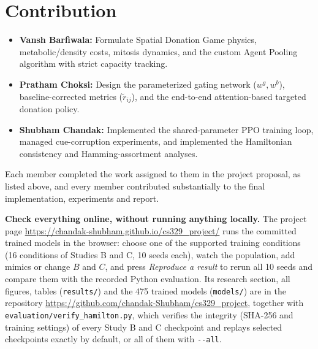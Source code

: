 \documentclass{article}
\begin{document}
\section{Contribution}
\begin{itemize}
    \item \textbf{Vansh Barfiwala:} Formulate Spatial Donation Game physics, metabolic/density costs, mitosis dynamics, and the custom Agent Pooling algorithm with strict capacity tracking.
    \item \textbf{Pratham Choksi:} Design the parameterized gating network ($w^g, w^b$), baseline-corrected metrics ($\tilde{r}_{ij}$), and the end-to-end attention-based targeted donation policy.
    \item \textbf{Shubham Chandak:} Implemented the shared-parameter PPO training loop, managed cue-corruption experiments, and implemented the Hamiltonian consistency and Hamming-assortment analyses.
\end{itemize}
Each member completed the work assigned to them in the project proposal, as listed above, and every member contributed substantially to the final implementation, experiments and report.

\textbf{Check everything online, without running anything locally.} The project page \url{https://chandak-shubham.github.io/cs329_project/} runs the committed trained models in the browser: choose one of the supported training conditions (16 conditions of Studies B and C, 10 seeds each), watch the population, add mimics or change $B$ and $C$, and press \emph{Reproduce a result} to rerun all 10 seeds and compare them with the recorded Python evaluation. Its research section, all figures, tables (\texttt{results/}) and the 475 trained models (\texttt{models/}) are in the repository \url{https://github.com/chandak-Shubham/cs329_project}, together with \texttt{evaluation/verify\_hamilton.py}, which verifies the integrity (SHA-256 and training settings) of every Study B and C checkpoint and replays selected checkpoints exactly by default, or all of them with \texttt{-{}-all}.
\end{document}
